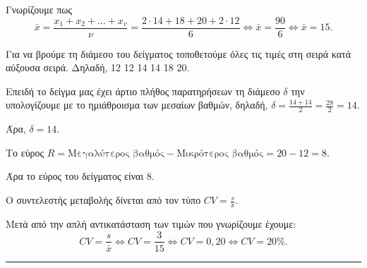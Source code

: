 
\begin{alist}
    \item Γνωρίζουμε πως
    \[ \bar{x} = \frac{x_1 + x_2 + \dots + x_v}{\nu} = \frac{2 \cdot 14 + 18 + 20 + 2 \cdot 12}{6} \iff \bar{x} = \frac{90}{6} \iff \bar{x} = 15. \]
    \item Για να βρούμε τη διάμεσο του δείγματος τοποθετούμε όλες τις τιμές στη σειρά κατά αύξουσα σειρά. Δηλαδή, 12 12 14 14 18 20.

    Επειδή το δείγμα μας έχει άρτιο πλήθος παρατηρήσεων τη διάμεσο $ \delta $ την υπολογίζουμε με το ημιάθροισμα των μεσαίων βαθμών, δηλαδή, $ \delta = \frac{14+14}{2} = \frac{28}{2} = 14 $.

    Άρα, $ \delta=14 $.

    Το εύρος $R= \text{Μεγαλύτερος βαθμός} - \text{Μικρότερος βαθμός} = 20-12=8$.

    Άρα το εύρος του δείγματος είναι 8.
    \item Ο συντελεστής μεταβολής δίνεται από τον τύπο $ CV = \frac{s}{\bar{x}} $.

    Μετά από την απλή αντικατάσταση των τιμών που γνωρίζουμε έχουμε:
    \[ CV = \frac{s}{\bar{x}} \iff CV = \frac{3}{15} \iff CV = 0,20 \iff CV = 20\%. \]
\end{alist}
\vspace{6mm}
\noindent\rule{\textwidth}{0.4pt}
\vspace{6mm}

